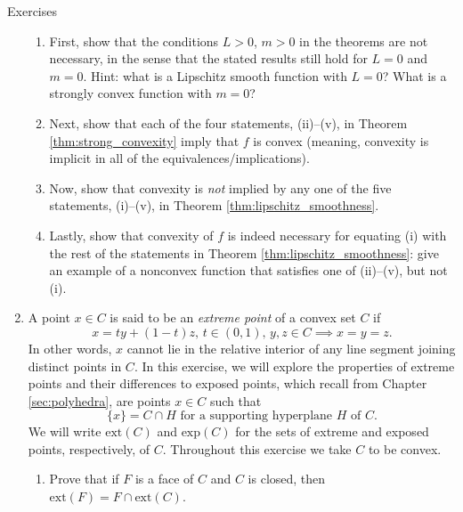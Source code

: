 \begin{xcb}{Exercises}
\begin{enumerate}[label=\thechapter.\arabic*]
\begin{enumerate}[label=\alph*.]
\item First, show that the conditions $L>0$, $m>0$ in the theorems are
  not necessary, in the sense that the stated results still hold for $L=0$ and 
  $m=0$. Hint: what is a Lipschitz smooth function with $L=0$? What is a 
  strongly convex function with $m=0$?

\item Next, show that each of the four statements, (ii)--(v), in Theorem 
  \ref{thm:strong_convexity} imply that $f$ is convex (meaning, convexity is 
  implicit in all of the equivalences/implications). 

\item Now, show that convexity is \emph{not} implied by any one of the five  
  statements, (i)--(v), in Theorem \ref{thm:lipschitz_smoothness}. 

\item Lastly, show that convexity of $f$ is indeed necessary for equating (i)
  with the rest of the statements in Theorem \ref{thm:lipschitz_smoothness}:
  give an example of a nonconvex function that satisfies one of (ii)--(v), but
  not (i).  
\end{enumerate}
 
\item \label{ex:extreme_points}
  A point $x \in C$ is said to be an \emph{extreme point} of a convex set $C$ if
  \[
  x = t y + (1-t) z, \, t \in (0,1), \, y,z \in C \implies x = y = z.
  \]
  In other words, $x$ cannot lie in the relative interior of any line segment
  joining distinct points in $C$. In this exercise, we will explore the
  properties of extreme points and their differences to exposed points, which
  recall from Chapter \ref{sec:polyhedra}, are points $x \in C$ such that  
  \[
  \text{$\{x\} = C \cap H$ for a supporting hyperplane $H$ of $C$}.
  \]
  We will write $\mathrm{ext}(C)$ and $\mathrm{exp}(C)$ for the sets of extreme
  and exposed points, respectively, of $C$. Throughout this exercise we take $C$ 
  to be convex.

\begin{enumerate}[label=\alph*.]
\item Prove that if $F$ is a face of $C$ and $C$ is closed, then
  $\mathrm{ext}(F) = F \cap \mathrm{ext}(C)$. 


\end{enumerate}
\end{enumerate}
\end{xcb}
